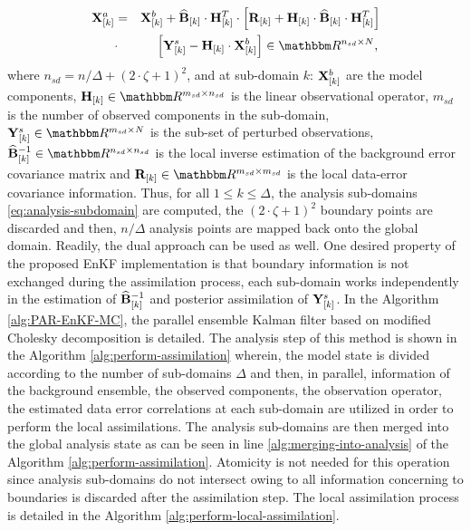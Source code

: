 \documentclass[12pt]{article}
\newcommand{\ra}{\zeta}
\newcommand{\Nens}{N} \newcommand{\Nobs}{m} \newcommand{\Nstate}{n} \newcommand{\X}{{\bf X}} \newcommand{\x}{{\bf x}} \newcommand{\J}{\mathcal{J}} \newcommand{\lp}{\left (} \newcommand{\rp}{\right )} \newcommand{\lb}{\left [} \newcommand{\rb}{\right ]} \renewcommand{\ln}{\left \|} \newcommand{\rn}{\right \|}
\newcommand{\BEST}{\widehat{\bf B}}
\begin{document}
\begin{eqnarray}
\label{eq:analysis-subdomain}
\X^a_{[k]} &=& \X^b_{[k]}+ \BEST_{[k]} \cdot \H^T_{[k]} \cdot \lb \R_{[k]}+\H_{[k]} \cdot \BEST_{[k]} \cdot \H_{[k]}^T \rb  \\ \nonumber
& \cdot & \lb \Y^s_{[k]} - \H_{[k]} \cdot \X^b_{[k]}\rb \in \Re^{\Nstate_{sd} \times \Nens} ,\,
\end{eqnarray}
where $\Nstate_{sd}  =  \Nstate / \Delta +  (2 \cdot \ra+1)^2$, and at sub-domain $k$: $\X^b_{[k]}$ are the model components, $\H_{[k]} \in \Re^{\Nobs_{sd} \times \Nstate_{sd}}$ is the linear observational operator, $\Nobs_{sd}$ is the number of observed components in the sub-domain, $\Y^s_{[k]} \in \Re^{\Nobs_{sd} \times \Nens}$ is the sub-set of perturbed observations, $\BEST^{-1}_{[k]} \in \Re^{\Nstate_{sd} \times \Nstate_{sd}}$ is the local inverse estimation of the background error covariance matrix and $\R_{[k]} \in \Re^{\Nobs_{sd} \times \Nobs_{sd}}$ is the local data-error covariance information. Thus, for all $1 \le k \le \Delta$, the analysis sub-domains \eqref{eq:analysis-subdomain} are computed, the $(2 \cdot \ra + 1)^2$ boundary points are discarded and then, $\Nstate / \Delta$ analysis points are mapped back onto the global domain. Readily, the dual approach can be used as well. One desired property of the proposed EnKF implementation is that boundary information is not exchanged during the assimilation process, each sub-domain works independently in the estimation of $\BEST^{-1}_{[k]}$ and posterior assimilation of ${\bf Y}^s_{[k]}$. In the Algorithm \ref{alg:PAR-EnKF-MC}, the parallel ensemble Kalman filter based on modified Cholesky decomposition is detailed. The analysis step of this method is shown in the Algorithm \ref{alg:perform-assimilation} wherein, the model state is divided according to the number of sub-domains $\Delta$ and then, in parallel, information of the background ensemble, the observed components, the observation operator, the estimated data error correlations at each sub-domain are utilized in order to perform the local assimilations. The analysis sub-domains are then merged into the global analysis state as can be seen in line \ref{alg:merging-into-analysis} of the Algorithm \ref{alg:perform-assimilation}. Atomicity is not needed for this operation since analysis sub-domains do not intersect owing to all information concerning to boundaries is discarded after the assimilation step. The local assimilation process is detailed in the Algorithm \eqref{alg:perform-local-assimilation}.
\end{document}
